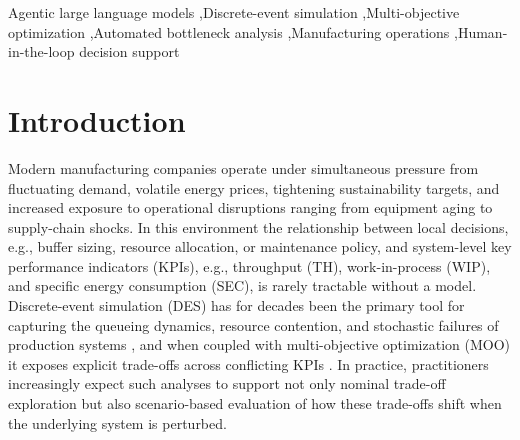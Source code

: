 \documentclass[a4paper,fleqn]{cas-sc}
\begin{document}


\begin{keywords}                                      Agentic large language models \sep                    Discrete-event simulation \sep                        Multi-objective optimization \sep                     Automated bottleneck analysis \sep Manufacturing operations \sep               Human-in-the-loop decision support                    \end{keywords}

{%
\hfuzz=120pt
\maketitle
}


  \section{Introduction}\label{sec:intro}                                                                               
                                                                                                                        
Modern manufacturing companies operate under simultaneous pressure from fluctuating demand, volatile energy prices, tightening sustainability targets, and increased exposure to operational disruptions ranging from equipment aging to supply-chain shocks. In this environment the relationship between local decisions, e.g., buffer sizing, resource allocation, or maintenance policy, and system-level key performance indicators (KPIs), e.g., throughput (TH), work-in-process (WIP), and specific energy consumption (SEC), is rarely tractable without a model. Discrete-event simulation (DES) has for decades been the primary tool for capturing the queueing dynamics, resource contention, and stochastic failures of production systems \citep{Mawson2019,Greasley2019}, and when coupled with multi-objective optimization (MOO) it exposes explicit trade-offs across conflicting KPIs \citep{Wang2011,Ojstersek2020}. In practice, practitioners increasingly expect such analyses to support not only nominal trade-off exploration but also scenario-based evaluation of how these trade-offs shift when the underlying system is perturbed.
\end{document}
